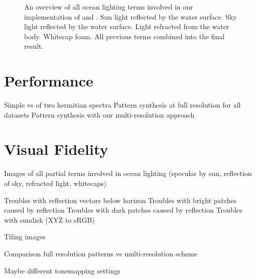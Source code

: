 \begin{figure}
{	\label{fig:results:complete}
 }
\caption{An overview of all ocean lighting terms involved in our implementation
of \citet{article:oceanlighting,misc:oceanlightingfft} and \citet{article:whitecaps}.
 Sun light reflected by the water surface.
 Sky light reflected by the water surface.
 Light refracted from the water body.
 Whitecap foam.
 All previous terms combined into the final
result.
}
\label{fig:results}
\end{figure}
%

\section{Performance}

Simple \InvFourierTransform vs \InvFourierTransform of two hermitian spectra
Pattern synthesis at full resolution for all datasets
Pattern synthesis with our multi-resolution approach

\section{Visual Fidelity}

Images of all partial terms involved in ocean lighting (specular by sun,
reflection of sky, refracted light, whitecaps)

Troubles with reflection vectors below horizon
Troubles with bright patches caused by reflection
Troubles with dark patches caused by reflection
Troubles with sundisk (XYZ to sRGB)

Tiling images

Comparison full resolution patterns vs multi-resolution scheme

Maybe different tonemapping settings